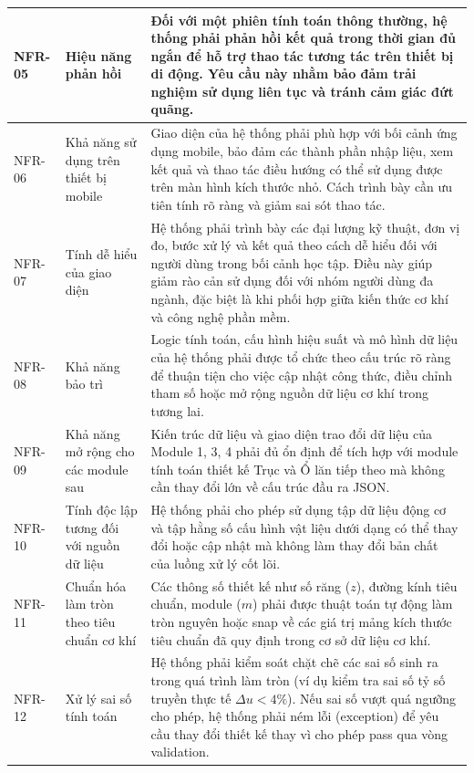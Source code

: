 \documentclass[a4paper]{article}
\begin{document}
\begin{longtable}{|>{\raggedright\arraybackslash}p{1.8cm}|>{\raggedright\arraybackslash}p{4.2cm}|>{\raggedright\arraybackslash}p{8.2cm}|}
NFR-05 & Hiệu năng phản hồi & Đối với một phiên tính toán thông thường, hệ thống phải phản hồi kết quả trong thời gian đủ ngắn để hỗ trợ thao tác tương tác trên thiết bị di động. Yêu cầu này nhằm bảo đảm trải nghiệm sử dụng liên tục và tránh cảm giác đứt quãng. \\ \hline

NFR-06 & Khả năng sử dụng trên thiết bị mobile & Giao diện của hệ thống phải phù hợp với bối cảnh ứng dụng mobile, bảo đảm các thành phần nhập liệu, xem kết quả và thao tác điều hướng có thể sử dụng được trên màn hình kích thước nhỏ. Cách trình bày cần ưu tiên tính rõ ràng và giảm sai sót thao tác. \\ \hline

NFR-07 & Tính dễ hiểu của giao diện & Hệ thống phải trình bày các đại lượng kỹ thuật, đơn vị đo, bước xử lý và kết quả theo cách dễ hiểu đối với người dùng trong bối cảnh học tập. Điều này giúp giảm rào cản sử dụng đối với nhóm người dùng đa ngành, đặc biệt là khi phối hợp giữa kiến thức cơ khí và công nghệ phần mềm. \\ \hline

NFR-08 & Khả năng bảo trì & Logic tính toán, cấu hình hiệu suất và mô hình dữ liệu của hệ thống phải được tổ chức theo cấu trúc rõ ràng để thuận tiện cho việc cập nhật công thức, điều chỉnh tham số hoặc mở rộng nguồn dữ liệu cơ khí trong tương lai. \\ \hline

NFR-09 & Khả năng mở rộng cho các module sau & Kiến trúc dữ liệu và giao diện trao đổi dữ liệu của Module 1, 3, 4 phải đủ ổn định để tích hợp với module tính toán thiết kế Trục và Ổ lăn tiếp theo mà không cần thay đổi lớn về cấu trúc đầu ra JSON. \\ \hline

NFR-10 & Tính độc lập tương đối với nguồn dữ liệu & Hệ thống phải cho phép sử dụng tập dữ liệu động cơ và tập hằng số cấu hình vật liệu dưới dạng có thể thay đổi hoặc cập nhật mà không làm thay đổi bản chất của luồng xử lý cốt lõi. \\ \hline

NFR-11 & Chuẩn hóa làm tròn theo tiêu chuẩn cơ khí & Các thông số thiết kế như số răng (\(z\)), đường kính tiêu chuẩn, module (\(m\)) phải được thuật toán tự động làm tròn nguyên hoặc snap về các giá trị mảng kích thước tiêu chuẩn đã quy định trong cơ sở dữ liệu cơ khí. \\ \hline

NFR-12 & Xử lý sai số tính toán & Hệ thống phải kiểm soát chặt chẽ các sai số sinh ra trong quá trình làm tròn (ví dụ kiểm tra sai số tỷ số truyền thực tế \(\Delta u < 4\%\)). Nếu sai số vượt quá ngưỡng cho phép, hệ thống phải ném lỗi (exception) để yêu cầu thay đổi thiết kế thay vì cho phép pass qua vòng validation. \\ \hline

\end{longtable}
\end{document}
